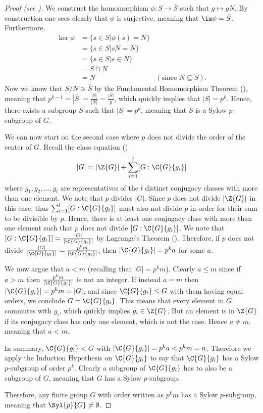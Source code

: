 \begin{proof}[Proof (see {\cite[pp.~1--3]{mann_2011}})]
    We construct the homomorphism $\phi: S \to \bar{S}$ such that $g \mapsto gN$. By construction one sees clearly that $\phi$ is surjective, meaning that $\im \phi = \bar{S}$. Furthermore,
    \begin{align*}
        \ker\phi &= \{s \in S \vert \phi(s) = N\}\\
        &= \{s \in S \vert sN = N \}\\
        &= \{s \in S \vert s \in N \}\\
        &= S \cap N\\
        &= N & (\text{since } N \subseteq S).
    \end{align*}
    Now we know that $S/N \cong \bar{S}$ by the Fundamental Homomorphism Theorem (), meaning that $p^{k-1} = |\bar{S}| = \frac{|S|}{|N|} = \frac{|S|}{p}$, which quickly implies that $|S| = p^k$. Hence, there exists a subgroup $S$ such that $|S| = p^k$, meaning that $S$ is a Sylow $p$-subgroup of $G$.

    We can now start on the second case where $p$ does not divide the order of the center of $G$. Recall the class equation ()
    \[
        |G| = |\Z{G}| + \sum_{i=1}^l [G:\C{G}{g_i}]
    \]
    where $g_1, g_2, \dots, g_l$ are representatives of the $l$ distinct conjugacy classes with more than one element. We note that $p$ divides $|G|$. Since $p$ does not divide $|\Z{G}|$ in this case, thus $\sum_{i=1}^l [G:\C{G}{g_i}]$ must also not divide $p$ in order for their sum to be divisible by $p$. Hence, there is at least one conjugacy class with more than one element such that $p$ does not divide $[G:\C{G}{g_i}]$. We note that $[G:\C{G}{g_i}] = \frac{|G|}{|\C{G}{g_i}|}$ by Lagrange's Theorem (). Therefore, if $p$ does not divide $\frac{|G|}{|\C{G}{g_i}|} = \frac{p^k m}{|\C{G}{g_i}|}$, then $|\C{G}{g_i}| = p^ka$ for some $a$.

    We now argue that $a < m$ (recalling that $|G| = p^km$). Clearly $a \leq m$ since if $a > m$ then $\frac{p^k m}{|\C{G}{g_i}|}$ is not an integer. If instead $a = m$ then $|\C{G}{g_i}| = p^km = |G|$, and since $\C{G}{g_i} \leq G$ with them having equal orders, we conclude $G = \C{G}{g_i}$. This means that every element in $G$ commutes with $g_i$, which quickly implies $g_i \in \Z{G}$. But an element is in $\Z{G}$ if its conjugacy class has only one element, which is not the case. Hence $a \neq m$, meaning that $a < m$.

    In summary, $\C{G}{g_i} < G$ with $|\C{G}{g_i}| = p^ka < p^km = n$. Therefore we apply the Induction Hypothesis on $\C{G}{g_i}$ to say that $\C{G}{g_i}$ has a Sylow $p$-subgroup of order $p^k$. Clearly a subgroup of $\C{G}{g_i}$ has to also be a subgroup of $G$, meaning that $G$ has a Sylow $p$-subgroup.

    Therefore, any finite group $G$ with order written as $p^k m$ has a Sylow $p$-subgroup, meaning that $\Syl{p}{G} \neq \emptyset$.
\end{proof}

